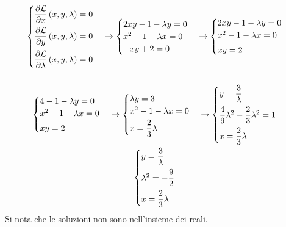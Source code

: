 \documentclass[a4paper]{article}
\begin{document}
	\begin{gather*}
		\begin{cases}
			\dfrac{\partial \mathcal{L}}{\partial x}\left(x,y,\lambda\right) = 0 \vspace{.5em} \\
			\dfrac{\partial \mathcal{L}}{\partial y}\left(x,y,\lambda\right) = 0 \vspace{.5em} \\
			\dfrac{\partial \mathcal{L}}{\partial \lambda}\left(x,y,\lambda\right) = 0
		\end{cases}
		\rightarrow
		\begin{cases}
			2xy-1-\lambda y = 0 \\
			x^{2} - 1 - \lambda x = 0 \\
			- xy + 2 = 0
		\end{cases}
		\rightarrow
		\begin{cases}
			2xy-1-\lambda y = 0 \\
			x^{2} - 1 - \lambda x = 0 \vspace{.3em} \\
			xy = 2
		\end{cases}
		\\ \\
		\begin{cases}
			4-1-\lambda y = 0 \\
			x^{2} - 1 - \lambda x = 0 \vspace{.3em} \\
			xy = 2
		\end{cases}
		\rightarrow
		\begin{cases}
			\lambda y = 3 \\
			x^{2} - 1 - \lambda x = 0 \vspace{.3em} \\
			x = \dfrac{2}{3}\lambda
		\end{cases}
		\rightarrow
		\begin{cases}
			y = \dfrac{3}{\lambda} \vspace{.5em} \\
			\dfrac{4}{9}\lambda^{2} - \dfrac{2}{3}\lambda^{2} = 1 \vspace{.5em} \\
			x = \dfrac{2}{3}\lambda
		\end{cases}
		\\
		\begin{cases}
			y = \dfrac{3}{\lambda} \vspace{.5em} \\
			\lambda^{2} = -\dfrac{9}{2} \vspace{.5em} \\
			x = \dfrac{2}{3}\lambda
		\end{cases}
	\end{gather*}
	Si nota che le soluzioni non sono nell'insieme dei reali.
\end{document}
